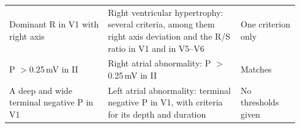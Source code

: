\begin{table}[!htbp]
\begin{tabular}{L{0.32\linewidth}L{0.43\linewidth}L{0.19\linewidth}}
    Dominant R in V1 with right axis & Right ventricular hypertrophy: several criteria, among them right axis deviation
      and the R/S ratio in V1 and in V5--V6~\citep{hancock2009recommendations} & One criterion only \\
    P $>$0.25\,mV in II & Right atrial abnormality: P $>$0.25\,mV in II~\citep{hancock2009recommendations} & Matches \\
    A deep and wide terminal negative P in V1 & Left atrial abnormality: terminal negative P in V1, with criteria for its
      depth and duration~\citep{hancock2009recommendations} & No thresholds given \\
    \bottomrule
  \end{tabular}
\end{table}
\MeasurementTable
\ProvenanceTable

